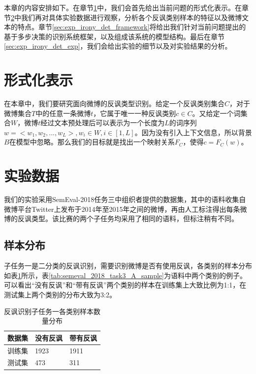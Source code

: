 本章的内容安排如下。在章节\ref{sec:exp_irony_det_format}中，我们会首先给出当前问题的形式化表示。在章节\ref{sec:exp_irony_det_data}中我们再对具体实验数据进行观察，分析各个反讽类别样本的特征以及微博文本的特点。章节\ref{sec:exp_irony_det_framework}将给出我们针对当前问题提出的基于多步决策的识别系统框架，以及组成该系统的模型结构。最后在章节\ref{sec:exp_irony_det_exp}，我们会给出实验的细节以及对实验结果的分析。

\section{形式化表示}
\label{sec:exp_irony_det_format}

在本章中，我们要研究面向微博的反讽类型识别。给定一个反讽类别集合$C$，对于微博集合$T$中的任意一条微博$t$，它属于唯一一种反讽类别$c \in C$。又给定一个词集合$W$，微博$t$经过文本预处理后可以表示为一个长度为$L$的词序列 $w = <w_1, w_2, ..., w_L>, w_i \in W, i \in [1, L]$。因为没有引入上下文信息，所以背景$B$在模型中忽略。那么我们的目标就是找出一个映射关系$F_C$，使得$c=F_C(w)$。

\section{实验数据}
\label{sec:exp_irony_det_data}

我们的实验采用SemEval-2018任务三中组织者提供的数据集，其中的语料收集自微博平台Twitter上发布于2014年至2015年之间的微博，再由人工标注得出每条微博的反讽类型。该比赛的两个子任务均采用了相同的语料，但标注稍有不同。

\subsection{样本分布}

子任务一是二分类的反讽识别，需要识别微博是否有使用反讽，各类别的样本分布如表\ref{tab:semeval_2018_task3_A_data}所示，表\ref{tab:semeval_2018_task3_A_sample}为语料中两个类别的例子。可以看出“没有反讽”和“带有反讽”两个类别的样本在训练集上大致比例为1:1，在测试集上两个类别的分布大致为3:2。

\begin{table}[htb]
  \centering
  \begin{minipage}[t]{0.7\linewidth} %
  \caption{反讽识别子任务一各类别样本数量分布}
  \label{tab:semeval_2018_task3_A_data}
    \begin{tabularx}{\linewidth}{X|XX}
    \toprule[1.5pt]
    数据集 & 没有反讽 & 带有反讽 \\  
    \hline
    训练集 & 1923 & 1911 \\
    测试集 & 473  & 311 \\
    \bottomrule[1.5pt]
    \end{tabularx}
  \end{minipage}
\end{table}

